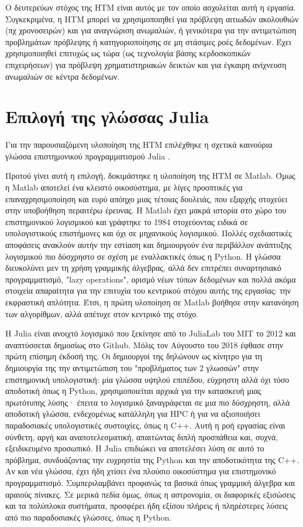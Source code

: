   Ο δευτερεύων στόχος της HTM είναι αυτός με τον οποίο ασχολείται αυτή η εργασία.
  Συγκεκριμένα, η HTM μπορεί να χρησιμοποιηθεί για πρόβλεψη αιτιωδών ακολουθιών (πχ χρονοσειρών) και για αναγνώριση ανωμαλιών,
  ή γενικότερα για την αντιμετώπιση προβλημάτων πρόβλεψης ή κατηγοριοποίησης σε μη στάσιμες ροές δεδομένων.
  Έχει χρησιμοποιηθεί επιτυχώς ως τώρα (ως τεχνολογία βάσης κερδοσκοπικών επιχειρήσεων) για πρόβλεψη χρηματιστηριακών δεικτών
  και για έγκαιρη ανίχνευση ανωμαλιών σε κέντρα δεδομένων.

\section{Επιλογή της γλώσσας Julia}

  Για την παρουσιαζόμενη υλοποίηση της HTM επιλέχθηκε η σχετικά καινούρια γλώσσα επιστημονικού προγραμματισμού Julia \parencite{bezansonJuliaFreshApproach2017}.

  Προτού γίνει αυτή η επιλογή, δοκιμάστηκε η υλοποίηση της HTM σε Matlab.
  Όμως η Matlab αποτελεί ένα κλειστό οικοσύστημα, με λίγες προοπτικές για επαναχρησιμοποίηση και ευρύ απόηχο μιας τέτοιας δουλειάς,
  που εξαρχής στοχεύει στην υποβοήθηση περαιτέρω έρευνας.
  Η Matlab έχει μακρά ιστορία στο χώρο του επιστημονικού λογισμικού και γράφτηκε το 1984 στοχεύοντας ειδικά σε υπολογιστικούς επιστήμονες και όχι σε μηχανικούς λογισμικού.
  Πολλές σχεδιαστικές αποφάσεις ανακλούν αυτήν την εστίαση και δημιουργούν ένα περιβάλλον ανάπτυξης λογισμικού πιο δύσχρηστο σε σχέση με εναλλακτικές όπως η Python.
  Η γλώσσα διευκολύνει μεν τη χρήση γραμμικής άλγεβρας, αλλά δεν επιτρέπει συναρτησιακό προγραμματισμό, "lazy operations", ορισμό νέων τύπων δεδομένων
  και πολλά ακόμα στοιχεία απαραίτητα για την επιτυχία του κεντρικού στόχου αυτής της εργασίας: την εκφραστική απλότητα.
  Έτσι, η πρώτη υλοποίηση σε Matlab βοήθησε στην κατανόηση των αλγορίθμων, αλλά απέτυχε στον κεντρικό της στόχο.

  Η Julia είναι ανοιχτό λογισμικό που ξεκίνησε από το JuliaLab του MIT το 2012 και αναπτύσσεται δημοσίως στο Github.
  Μόλις τον Αύγουστο του 2018 έφθασε στην πρώτη επίσημη έκδοσή της.
  Οι δημιουργοί της δηλώνουν ως κίνητρο για τη δημιουργία της την αντιμετώπιση του "προβλήματος των 2 γλωσσών" στην επιστημονική υπολογιστική:
  μία γλώσσα υψηλού επιπέδου, εύχρηστη αλλά όχι τόσο αποδοτική όπως η Python, χρησιμοποιείται αρχικά για την κατασκευή μιας πρωτότυπης λύσης·
  έπειτα το λογισμικό ξαναγράφεται σε μια πιο δύσχρηστη, αλλά αποδοτική γλώσσα,
  ενδεχομένως κατάλληλη για HPC ή για να αξιοποιήσει παραδοσιακές υπολογιστικές συστοιχίες, όπως η C++.
  Αυτή η ροή εργασίας είναι σύνθετη, αργή και αναποτελεσματική, απαιτώντας διπλή προσπάθεια και, συχνά, εξειδικευμένο προσωπικό.
  Η Julia επιδιώκει να αποτελέσει λύση σε αυτό το πρόβλημα, συνδυάζοντας την ευχρηστία της Python και την αποδοτικότητα της C++.
  Αν και νέα γλώσσα, έχει ήδη χτίσει ένα πλούσιο οικοσύστημα για επιστημονικό προγραμματισμό.
  Συμπεριλαμβάνει προφανώς τα βασικά όπως γραμμική άλγεβρα και αραιούς πίνακες.
  Σε μερικά πεδία όμως, όπως η αστρονομία, οι διαφορικές εξισώσεις και τα πολύπλοκα συστήματα, προσφέρει ήδη εξίσου πλήρεις ή πληρέστερες λύσεις
  από πιο παραδοσιακές γλώσσες, όπως η Python.

